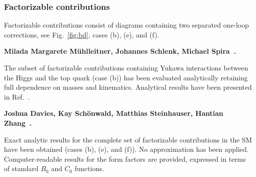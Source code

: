 \subsubsection{Factorizable contributions}

\label{EW:1loopX1loop}



Factorizable contributions consist of diagrams containing two separated one-loop corrections, see Fig.~\ref{fig:bd}, cases (b), (e), and (f).


\noindent \textbf{Milada Margarete Mühlleitner, Johannes Schlenk, Michael Spira~\cite{Muhlleitner:2022ijf}.}

\noindent The subset of factorizable contributions containing Yukawa interactions between the Higgs and the top quark (case (b)) has been evaluated analytically retaining full dependence on masses and kinematics. Analytical results have been presented in Ref.~\cite{Muhlleitner:2022ijf}.


\noindent \textbf{Joshua Davies, Kay Schönwald, Matthias Steinhauser, Hantian Zhang~\cite{Zhang:2024rix}.}

\noindent Exact analytic results for the complete set of factorizable contributions in the SM have been obtained (cases (b), (e), and (f)). No approximation has been applied. Computer-readable results for the form factors are provided, expressed in terms of standard $B_0$ and $C_0$ functions.
